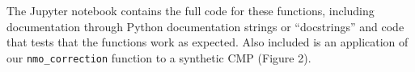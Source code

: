 The Jupyter notebook contains the full code for these functions, including
documentation through Python documentation strings or ``docstrings'' and code
that tests that the functions work as expected.
Also included is an application of our \texttt{nmo\_correction} function to a
synthetic CMP (Figure 2).
